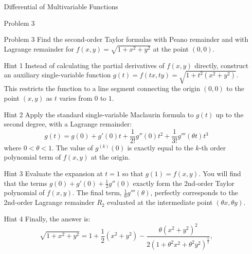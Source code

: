 \documentclass{beamer}
\begin{document}
\begin{section}{Differential of Multivariable Functions}
\begin{subsection}{Problem 3}
    \begin{frame}
        \begin{block}{Problem 3}
            Find the second-order Taylor formulas with Peano remainder and with Lagrange remainder for $f(x,y) = \sqrt{1+x^2+y^2}$ at the point $(0,0)$.    
        \end{block}
    \end{frame}

    \begin{frame}
        \begin{block}{Hint 1}
            Instead of calculating the partial derivatives of $f(x,y)$ directly, construct an auxiliary single-variable function $g(t) = f(tx, ty) = \sqrt{1 + t^2(x^2+y^2)}$. This restricts the function to a line segment connecting the origin $(0,0)$ to the point $(x,y)$ as $t$ varies from $0$ to $1$.
        \end{block}

        \pause
        \vspace{1em}
        \begin{block}{Hint 2}
            Apply the standard single-variable Maclaurin formula to $g(t)$ up to the second degree, with a Lagrange remainder:
            $$
            g(t) = g(0) + g'(0)t + \frac{1}{2!}g''(0)t^2 + \frac{1}{3!}g'''(\theta t)t^3
            $$
            where $0 < \theta < 1$. The value of $g^{(k)}(0)$ is exactly equal to the $k$-th order polynomial term of $f(x,y)$ at the origin.
           \end{block}
    \end{frame}

    \begin{frame}
        \begin{block}{Hint 3}
            Evaluate the expansion at $t=1$ so that $g(1) = f(x,y)$. You will find that the terms $g(0) + g'(0) + \frac{1}{2}g''(0)$ exactly form the 2nd-order Taylor polynomial of $f(x,y)$. The final term, $\frac{1}{6}g'''(\theta)$, perfectly corresponds to the 2nd-order Lagrange remainder $R_2$ evaluated at the intermediate point $(\theta x, \theta y)$.
        \end{block}

        \pause
        \vspace{1em}
        \begin{block}{Hint 4}
            Finally, the answer is:
            $$
            \sqrt{1 + x^2 + y^2} = 1 + \frac{1}{2}(x^2 + y^2) - \frac{\theta(x^2 + y^2)^2}{2(1 + \theta^2 x^2 + \theta^2 y^2)^{\frac{5}{2}}},
            $$
        \end{block}
    \end{frame}
\end{subsection}


\end{section}
\end{document}
